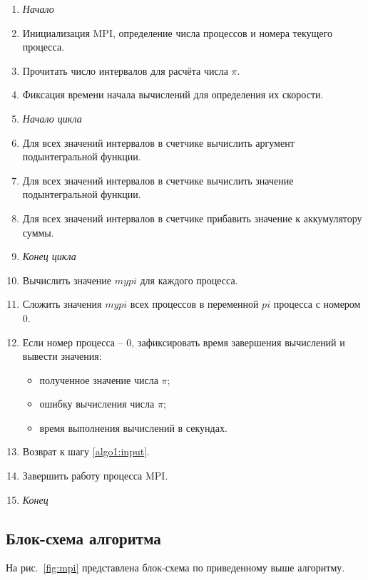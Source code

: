 \documentclass{altsu-bachelor}
\begin{document}
\begin{enumerate}
    \item \textit{Начало}
    \item Инициализация MPI, определение числа процессов и номера текущего процесса.
    \item \label{algo1:input}Прочитать число интервалов для расчёта числа $\pi$.
    \item Фиксация времени начала вычислений для определения их скорости.
    \item \textit{Начало цикла}
    \item Для всех значений интервалов в счетчике вычислить аргумент подынтегральной функции.
    \item Для всех значений интервалов в счетчике вычислить значение подынтегральной функции.
    \item Для всех значений интервалов в счетчике прибавить значение к аккумулятору суммы.
    \item \textit{Конец цикла}
    \item Вычислить значение $mypi$ для каждого процесса.
    \item Сложить значения $mypi$ всех процессов в переменной $pi$ процесса с номером 0.
    \item Если номер процесса -- 0, зафиксировать время завершения вычислений и вывести значения:
    \begin{itemize}
        \item полученное значение числа $\pi$;
        \item ошибку вычисления числа $\pi$;
        \item время выполнения вычислений в секундах.
    \end{itemize}
    \item Возврат к шагу \ref{algo1:input}.
    \item Завершить работу процесса MPI.
    \item \textit{Конец}
\end{enumerate}

\subsection*{Блок-схема алгоритма}

На рис.~\ref{fig:mpi} представлена блок-схема по приведенному выше алгоритму.
\end{document}
